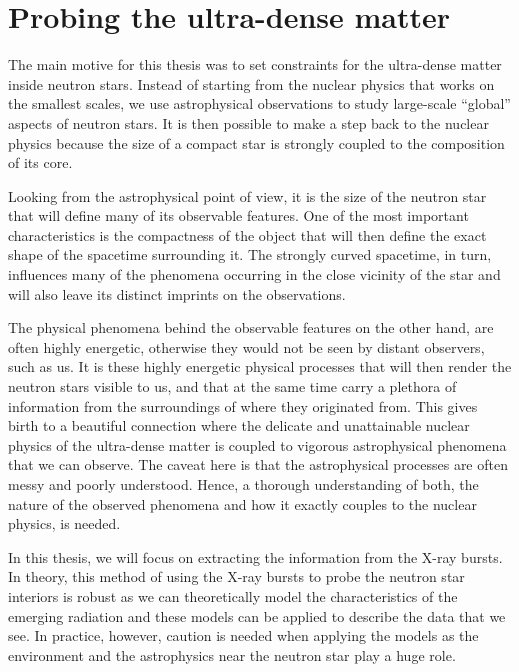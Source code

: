 \chapter{Probing the ultra-dense matter}

The main motive for this thesis was to set constraints for the ultra-dense matter inside neutron stars.
Instead of starting from the nuclear physics that works on the smallest scales, we use astrophysical observations to study large-scale ``global'' aspects of neutron stars.
It is then possible to make a step back to the nuclear physics because the size of a compact star is strongly coupled to the composition of its core.

Looking from the astrophysical point of view, it is the size of the neutron star that will define many of its observable features.
One of the most important characteristics is the compactness of the object that will then define the exact shape of the spacetime surrounding it.
The strongly curved spacetime, in turn, influences many of the phenomena occurring in the close vicinity of the star and will also leave its distinct imprints on the observations.

The physical phenomena behind the observable features on the other hand, are often highly energetic, otherwise they would not be seen by distant observers, such as us.
It is these highly energetic physical processes that will then render the neutron stars visible to us, and that at the same time carry a plethora of information from the surroundings of where they originated from.
This gives birth to a beautiful connection where the delicate and unattainable nuclear physics of the ultra-dense matter is coupled to vigorous astrophysical phenomena that we can observe.
The caveat here is that the astrophysical processes are often messy and poorly understood.
Hence, a thorough understanding of both, the nature of the observed phenomena and how it exactly couples to the nuclear physics, is needed.

In this thesis, we will focus on extracting the information from the X-ray bursts.
In theory, this method of using the X-ray bursts to probe the neutron star interiors is robust as we can theoretically model the characteristics of the emerging radiation and these models can be applied to describe the data that we see. 
In practice, however, caution is needed when applying the models as the environment and the astrophysics near the neutron star play a huge role.


